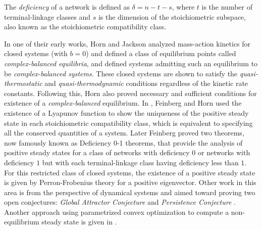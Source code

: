 \documentclass[smallextended]{svjour3}       %
\newcommand*{\0}{\mathbf{0}}
\newcommand*{\1}{\mathbf{1}}
\begin{document}
\begin{defn}
	The \emph{deficiency} of a network is defined as $\delta = n - t - s$, where $t$ is
	the number of terminal-linkage classes and $s$ is the dimension of the
	stoichiometric subspace, also known as the stoichiometric compatibility class.
\end{defn}

In one of their early works, Horn and Jackson \cite{GMAK} analyzed mass-action
kinetics for closed systems (with $b=0$) and defined a class of equilibrium
points called \emph{complex-balanced equilibria}, and defined systems admitting
such an equilibrium to be \emph{complex-balanced systems}. These closed systems
are shown to satisfy the \emph{quasi-thermostatic} and
\emph{quasi-thermodynamic} conditions regardless of the kinetic rate constants.
Following this, Horn \cite{necc-suff-CB} also proved necessary and sufficient
conditions for existence of a \emph{complex-balanced} equilibrium. In
\cite{uniqueEPandLyapunov}, Feinberg and Horn used the existence of a Lyapunov
function to show the uniqueness of the positive steady state in each
stoichiometric compatibility class, which is equivalent to specifying all the
conserved quantities of a system. Later Feinberg \cite{deficiency0,deficiency1}
proved two theorems, now famously known as Deficiency 0-1
theorems, that provide the analysis of positive steady states for a
class of networks with deficiency $0$ or networks with deficiency $1$ but with
each terminal-linkage class having deficiency less than $1$. For this
restricted class of closed systems, the existence of a positive steady state is
given by Perron-Frobenius theory for a positive eigenvector.  Other work in
this area is from the perspective of dynamical systems and aimed toward proving
two open conjectures: \emph{Global Attractor Conjecture} and \emph{Persistence
Conjecture} \cite{Anderson-GAC}. Another approach using parametrized convex
optimization to compute a non-equilibrium steady state is given in
\cite{fleming-opt}.
\end{document}
